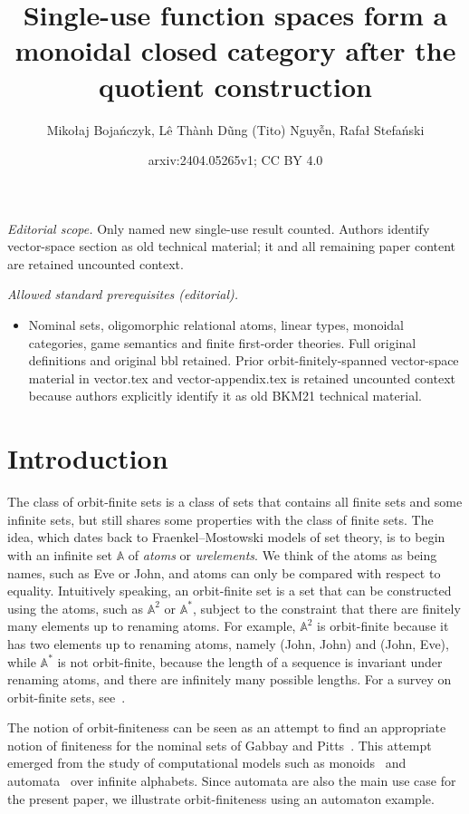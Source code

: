\documentclass[10pt,a4paper]{amsart}
\title{Single-use function spaces form a monoidal closed category after the quotient construction}
\author{Mikołaj Bojańczyk, Lê Thành Dũng (Tito) Nguyễn, Rafał Stefański}
\date{arxiv:2404.05265v1; CC BY 4.0}
\numberwithin{equation}{section}
\theoremstyle{plain}
\newcommand{\atoms}{\mathbb A}
\begin{document}
\maketitle
\noindent\textit{Editorial scope.} Only named new single-use result counted. Authors identify vector-space section as old technical material; it and all remaining paper content are retained uncounted context.\par\medskip
\noindent\textit{Allowed standard prerequisites (editorial).}\begin{itemize}
\item Nominal sets, oligomorphic relational atoms, linear types, monoidal categories, game semantics and finite first-order theories. Full original definitions and original bbl retained. Prior orbit-finitely-spanned vector-space material in vector.tex and vector-appendix.tex is retained uncounted context because authors explicitly identify it as old BKM21 technical material.
\end{itemize}\medskip
\section{Introduction}
The class of orbit-finite sets is a class of sets that contains all finite sets and some infinite sets, but still shares some properties with the class of finite sets.  The idea, which dates back to Fraenkel--Mostowski models of set theory,  is to begin with an infinite set $\atoms$ of \emph{atoms} or \emph{urelements}. We think of the atoms as being names, such as Eve or John, and atoms can only be compared with respect to equality. Intuitively speaking, an  orbit-finite set is a set  that can be constructed using the atoms, such as $\atoms^2$ or $\atoms^*$, subject to the constraint that there are finitely many elements up to  renaming atoms. For example, $\atoms^2$ is orbit-finite because it has two elements up to renaming atoms, namely (John, John) and (John, Eve), while $\atoms^*$ is not orbit-finite, because the length of a sequence is invariant under renaming atoms, and there are infinitely many possible lengths. For a survey on orbit-finite sets, see~\cite{bojanczyk_slightly2018}.

The notion of orbit-finiteness can be seen as an attempt to find an appropriate notion of finiteness for the  nominal sets of Gabbay and Pitts~\cite{PittsAM:nomsns}.  This attempt emerged from the study of computational models such as monoids~\cite{bojanczykNominalMonoids2013} and automata~\cite{bojanczykAutomataTheoryNominal2014} over infinite alphabets. Since automata are also the main use case for the present paper, we illustrate orbit-finiteness using an automaton example. 
\end{document}
